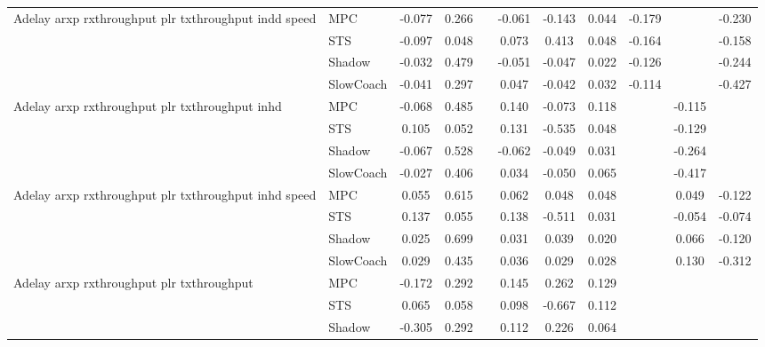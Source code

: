 \begin{tabular}{|l|l|*{9}{c|}}
\midrule
Adelay arxp rxthroughput plr txthroughput indd speed    & MPC &   -0.077 &     0.266 &        & -0.061 & -0.143 &  0.044 &  -0.179 &      &   -0.230 \\
                              & STS &   -0.097 &     0.048 &        &  0.073 &  0.413 &  0.048 &  -0.164 &      &   -0.158 \\
                              & Shadow &   -0.032 &     0.479 &        & -0.051 & -0.047 &  0.022 &  -0.126 &      &   -0.244 \\
                              & SlowCoach &   -0.041 &     0.297 &        &  0.047 & -0.042 &  0.032 &  -0.114 &      &   -0.427 \\
\midrule
Adelay arxp rxthroughput plr txthroughput inhd    & MPC &   -0.068 &     0.485 &        &  0.140 & -0.073 &  0.118 &      &  -0.115 &       \\
                              & STS &    0.105 &     0.052 &        &  0.131 & -0.535 &  0.048 &      &  -0.129 &       \\
                              & Shadow &   -0.067 &     0.528 &        & -0.062 & -0.049 &  0.031 &      &  -0.264 &       \\
                              & SlowCoach &   -0.027 &     0.406 &        &  0.034 & -0.050 &  0.065 &      &  -0.417 &       \\
\midrule
Adelay arxp rxthroughput plr txthroughput inhd speed    & MPC &    0.055 &     0.615 &        &  0.062 &  0.048 &  0.048 &      &   0.049 &   -0.122 \\
                              & STS &    0.137 &     0.055 &        &  0.138 & -0.511 &  0.031 &      &  -0.054 &   -0.074 \\
                              & Shadow &    0.025 &     0.699 &        &  0.031 &  0.039 &  0.020 &      &   0.066 &   -0.120 \\
                              & SlowCoach &    0.029 &     0.435 &        &  0.036 &  0.029 &  0.028 &      &   0.130 &   -0.312 \\
\midrule
Adelay arxp rxthroughput plr txthroughput    & MPC &   -0.172 &     0.292 &        &  0.145 &  0.262 &  0.129 &      &      &       \\
                              & STS &    0.065 &     0.058 &        &  0.098 & -0.667 &  0.112 &      &      &       \\
                              & Shadow &   -0.305 &     0.292 &        &  0.112 &  0.226 &  0.064 &      &      &       \\

\end{tabular}
